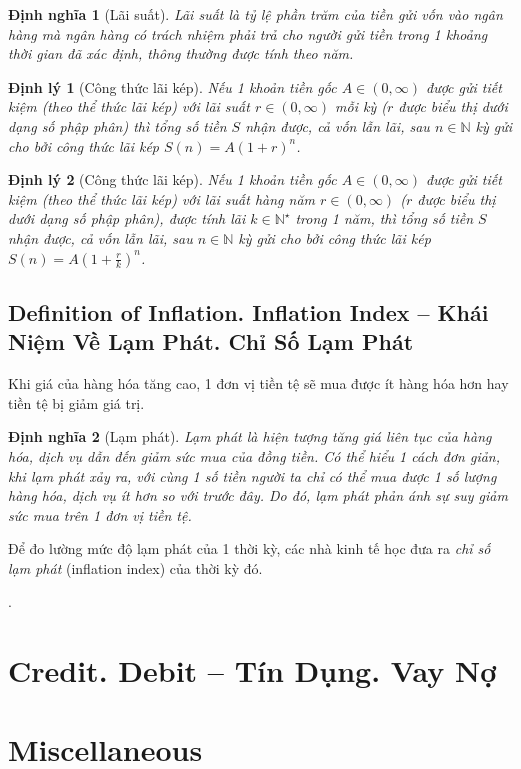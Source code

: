 \documentclass{article}
\newtheorem{dinhly}{Định lý}
\newtheorem{dinhnghia}{Định nghĩa}
\begin{document}
\begin{dinhnghia}[Lãi suất]
	\emph{Lãi suất} là tỷ lệ phần trăm của tiền gửi vốn vào ngân hàng mà ngân hàng có trách nhiệm phải trả cho người gửi tiền trong 1 khoảng thời gian đã xác định, thông thường được tính theo năm.
\end{dinhnghia}

\begin{dinhly}[Công thức lãi kép]
	Nếu 1 khoản tiền gốc $A\in(0,\infty)$ được gửi tiết kiệm (theo thể thức lãi kép) với lãi suất $r\in(0,\infty)$ mỗi kỳ ($r$ được biểu thị dưới dạng số phập phân) thì tổng số tiền $S$ nhận được, cả vốn lẫn lãi, sau $n\in\mathbb{N}$ kỳ gửi cho bởi \emph{công thức lãi kép} $S(n) = A(1 + r)^n$.
\end{dinhly}

\begin{dinhly}[Công thức lãi kép]
	Nếu 1 khoản tiền gốc $A\in(0,\infty)$ được gửi tiết kiệm (theo thể thức lãi kép) với lãi suất hàng năm $r\in(0,\infty)$ ($r$ được biểu thị dưới dạng số phập phân), được tính lãi $k\in\mathbb{N}^\star$ trong 1 năm, thì tổng số tiền $S$ nhận được, cả vốn lẫn lãi, sau $n\in\mathbb{N}$ kỳ gửi cho bởi \emph{công thức lãi kép} $S(n) = A\left(1 + \frac{r}{k}\right)^n$.
\end{dinhly}

\subsection{Definition of Inflation. Inflation Index -- Khái Niệm Về Lạm Phát. Chỉ Số Lạm Phát}
Khi giá của hàng hóa tăng cao, 1 đơn vị tiền tệ sẽ mua được ít hàng hóa hơn hay tiền tệ bị giảm giá trị.

\begin{dinhnghia}[Lạm phát]
	\emph{Lạm phát} là hiện tượng tăng giá liên tục của hàng hóa, dịch vụ dẫn đến giảm sức mua của đồng tiền. Có thể hiểu 1 cách đơn giản, khi lạm phát xảy ra, với cùng 1 số tiền người ta chỉ có thể mua được 1 số lượng hàng hóa, dịch vụ ít hơn so với trước đây. Do đó, lạm phát phản ánh sự suy giảm sức mua trên 1 đơn vị tiền tệ.
\end{dinhnghia}
Để đo lường mức độ lạm phát của 1 thời kỳ, các nhà kinh tế học đưa ra {\it chỉ số lạm phát} (inflation index) của thời kỳ đó. 

\cite[Chuyên đề II, \S3, LT1--3, 1., 2., 3., 4., 5., pp. 20--25]{CDHT_Toan_12_Canh_Dieu}.


\section{Credit. Debit -- Tín Dụng. Vay Nợ}


\section{Miscellaneous}


\printbibliography[heading=bibintoc]
	
\end{document}
